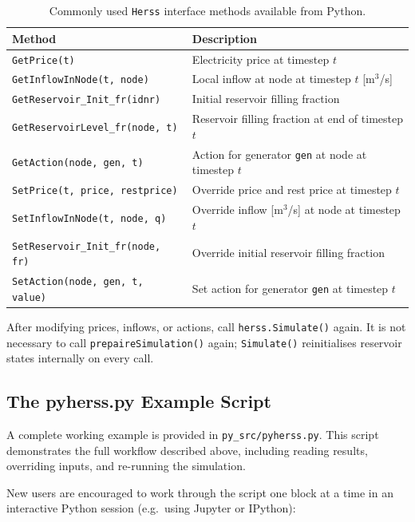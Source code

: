 \documentclass[a4paper, 12pt]{report}
\begin{document}
	\begin{table}[h]
	\centering
	\begin{tabular}{ll}
		\hline
		\textbf{Method} & \textbf{Description} \\
		\hline
		\texttt{GetPrice(t)} & Electricity price at timestep $t$ \\
		\texttt{GetInflowInNode(t, node)} & Local inflow at node at timestep $t$ [m$^3$/s] \\
		\texttt{GetReservoir\_Init\_fr(idnr)} & Initial reservoir filling fraction \\
		\texttt{GetReservoirLevel\_fr(node, t)} & Reservoir filling fraction at end of timestep $t$ \\
		\texttt{GetAction(node, gen, t)} & Action for generator \texttt{gen} at node at timestep $t$ \\
		\hline
		\texttt{SetPrice(t, price, restprice)} & Override price and rest price at timestep $t$ \\
		\texttt{SetInflowInNode(t, node, q)} & Override inflow [m$^3$/s] at node at timestep $t$ \\
		\texttt{SetReservoir\_Init\_fr(node, fr)} & Override initial reservoir filling fraction \\
		\texttt{SetAction(node, gen, t, value)} & Set action for generator \texttt{gen} at timestep $t$ \\
		\hline
	\end{tabular}
	\caption{Commonly used \texttt{Herss} interface methods available from Python.}
	\label{tab:herss_api}
	\end{table}

	After modifying prices, inflows, or actions, call \texttt{herss.Simulate()}
	again. It is not necessary to call \texttt{prepaireSimulation()} again;
	\texttt{Simulate()} reinitialises reservoir states internally on every call.

	\subsection{The pyherss.py Example Script}

	A complete working example is provided in \texttt{py\_src/pyherss.py}.
	This script demonstrates the full workflow described above, including reading
	results, overriding inputs, and re-running the simulation.

	New users are encouraged to work through the script one block at a time
	in an interactive Python session (e.g.\ using Jupyter or IPython):
\end{document}
